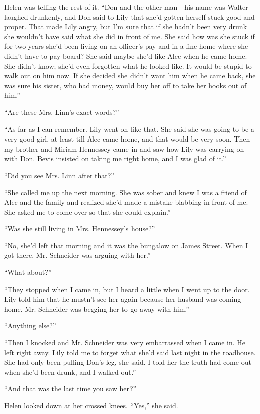 {Helen was telling the rest of it. “Don and the other man—his name was Walter—laughed drunkenly, and Don said to Lily that she’d gotten herself stuck good and proper. That made Lily angry, but I’m sure that if she hadn’t been very drunk she wouldn’t have said what she did in front of me. She said how was she stuck if for two years she’d been living on an officer’s pay and in a fine home where she didn’t have to pay board? She said maybe she’d like Alec when he came home. She didn’t know; she’d even forgotten what he looked like. It would be stupid to walk out on him now. If she decided she didn’t want him when he came back, she was sure his sister, who had money, would buy her off to take her hooks out of him.”

“Are these Mrs. Linn’s exact words?”

“As far as I can remember. Lily went on like that. She said she was going to be a very good girl, at least till Alec came home, and that would be very soon. Then my brother and Miriam Hennessey came in and saw how Lily was carrying on with Don. Bevis insisted on taking me right home, and I was glad of it.”

“Did you see Mrs. Linn after that?”

“She called me up the next morning. She was sober and knew I was a friend of Alec and the family and realized she’d made a mistake blabbing in front of me. She asked me to come over so that she could explain.”

“Was she still living in Mrs. Hennessey’s house?”

“No, she’d left that morning and it was the bungalow on James Street. When I got there, Mr. Schneider was arguing with her.”

“What about?”

“They stopped when I came in, but I heard a little when I went up to the door. Lily told him that he mustn’t see her again because her husband was coming home. Mr. Schneider was begging her to go away with him.”

“Anything else?”

“Then I knocked and Mr. Schneider was very embarrassed when I came in. He left right away. Lily told me to forget what she’d said last night in the roadhouse. She had only been pulling Don’s leg, she said. I told her the truth had come out when she’d been drunk, and I walked out.”

“And that was the last time you saw her?”

Helen looked down at her crossed knees. “Yes,” she said.

}
